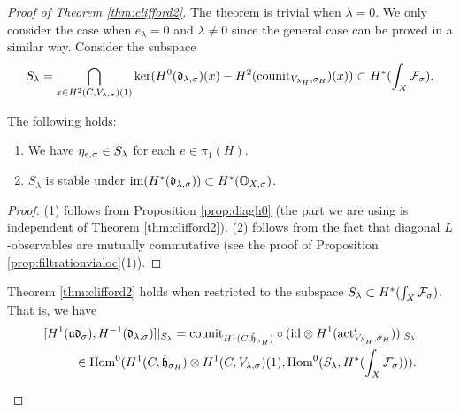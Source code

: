 \documentclass[reqno]{amsart}
\numberwithin{equation}{section}
\numberwithin{equation}{section}
\begin{document}
\begin{proof}[Proof of Theorem \ref{thm:clifford2}]
The theorem is trivial when $\lambda=0$. We only consider the case when $e_{\lambda}=0$ and $\lambda\neq 0$ since the general case can be proved in a similar way.  Consider the subspace \[S_{\lambda} = \bigcap_{x\in H^2(C,V_{\lambda,\sigma})(1)} \ker(H^0(\mathfrak{d}_{\lambda,\sigma})(x)-H^2(\mathrm{counit}_{V_{\lambda_H},\sigma_H})(x))\subset H^*(\int_{X}\mathcal{F}_{\sigma}) .\]


\begin{lemma}\label{lem:propertyofS}
    The following holds:
    \begin{enumerate}
        \item We have $\eta_{e,\sigma}\in S_{\lambda}$ for each $e\in \pi_1(H)$.
        \item $S_{\lambda}$ is stable under $\mathrm{im} (H^*(\mathfrak{d}_{\lambda, \sigma}))\subset H^*(\mathbb{O}_{X,\sigma})$.
    \end{enumerate}
\end{lemma}
\begin{proof}
    (1) follows from Proposition \ref{prop:diagh0} (the part we are using is independent of Theorem \ref{thm:clifford2}). (2) follows from the fact that diagonal $L$-observables are mutually commutative (see the proof of Proposition \ref{prop:filtrationvialoc}(1)).
\end{proof}





\begin{lemma}\label{lem:cliffordprim2}
    Theorem \ref{thm:clifford2} holds when restricted to the subspace $S_{\lambda}\subset H^*(\int_{X}\mathcal{F}_{\sigma})$. That is, we have \[\begin{split}[H^1(\mathfrak{a}\mathfrak{d}_{\sigma}),H^{-1}(\mathfrak{d}_{\lambda,\sigma})]|_{S_{\lambda}}=\mathrm{counit}_{H^1(C,\check{\mathfrak{h}}_{\sigma_H})}\circ (\mathrm{id}\otimes H^1(\mathrm{act}_{V_{\lambda_H},\sigma_H}'))|_{S_{\lambda}} \\ \in \operatorname{Hom}^0(H^1(C,\check{\mathfrak{h}}_{\sigma_H})\otimes H^1(C,V_{\lambda,\sigma})(1), \operatorname{Hom}^0(S_{\lambda},H^*(\int_{X}\mathcal{F}_{\sigma}))).\end{split}\]
\end{lemma}


\end{proof}
\end{document}
